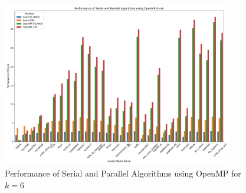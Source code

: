 \documentclass[12pt,oneside]{book} %
\begin{document}
\begin{figure}[H]
    \centering
    \includegraphics[width=0.9\textwidth]{../results/images/openMP_Performance_k6.png}
    \caption{Performance of Serial and Parallel Algorithms using OpenMP for $k=6$}
    \label{fig:openmp-performance-k6}
\end{figure}
\end{document}
